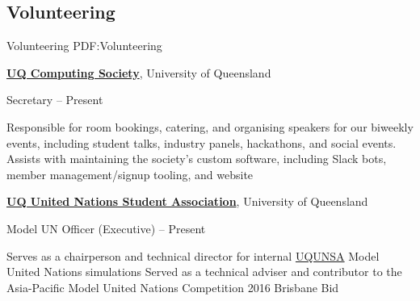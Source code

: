 \documentclass[a4paper,10pt,oneside]{article}
\begin{document}
\begin{body}




\section
{Volunteering}
{Volunteering}
{PDF:Volunteering}

\href{https://uqcs.org.au/}
{\textbf{UQ Computing Society}}, University of Queensland

\par Secretary\hfill {} -- Present

\begin{detail}
\BulletItem Responsible for room bookings, catering, and organising speakers for our biweekly events, including student talks, industry panels, hackathons, and social events.
\BulletItem Assists with maintaining the society's custom software, including Slack bots, member management/signup tooling, and website
\end{detail}

\EntryGap

\href{http://www.unsauq.org/}
{\textbf{UQ United Nations Student Association}}, University of Queensland

\par Model UN Officer (Executive)\hfill {} -- Present

\begin{detail}
\BulletItem Serves as a chairperson and technical director for internal \href{http://www.unsauq.org/}{UQUNSA} Model United Nations simulations 
\BulletItem Served as a technical adviser and contributor to the Asia-Pacific Model United Nations Competition 2016 Brisbane Bid
\end{detail}


\end{body}
\end{document}
